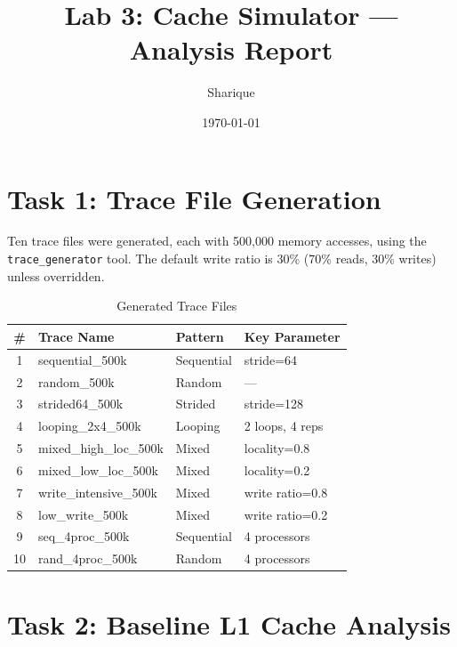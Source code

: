 \documentclass[12pt,a4paper]{article}
\title{\textbf{Lab 3: Cache Simulator --- Analysis Report}}
\author{Sharique}
\date{\today}
\begin{document}
\maketitle
\tableofcontents
\newpage

\section{Task 1: Trace File Generation}

Ten trace files were generated, each with 500{,}000 memory accesses, using the \texttt{trace\_generator} tool. The default write ratio is 30\% (70\% reads, 30\% writes) unless overridden.

\begin{table}[H]
\centering
\caption{Generated Trace Files}
\begin{tabular}{clll}
\toprule
\textbf{\#} & \textbf{Trace Name} & \textbf{Pattern} & \textbf{Key Parameter} \\
\midrule
1 & sequential\_500k & Sequential & stride=64 \\
2 & random\_500k & Random & --- \\
3 & strided64\_500k & Strided & stride=128 \\
4 & looping\_2x4\_500k & Looping & 2 loops, 4 reps \\
5 & mixed\_high\_loc\_500k & Mixed & locality=0.8 \\
6 & mixed\_low\_loc\_500k & Mixed & locality=0.2 \\
7 & write\_intensive\_500k & Mixed & write ratio=0.8 \\
8 & low\_write\_500k & Mixed & write ratio=0.2 \\
9 & seq\_4proc\_500k & Sequential & 4 processors \\
10 & rand\_4proc\_500k & Random & 4 processors \\
\bottomrule
\end{tabular}
\end{table}

\section{Task 2: Baseline L1 Cache Analysis}
\end{document}

